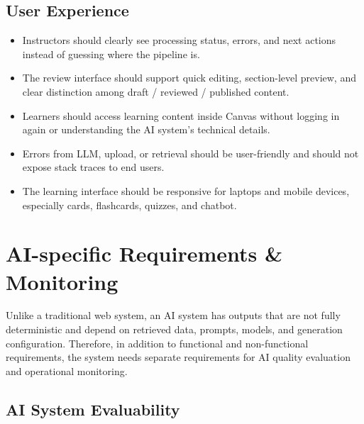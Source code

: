 \subsection{User Experience}
\label{subsec:trai-nghiem-nguoi-dung}

\begin{itemize}
    \item Instructors should clearly see processing status, errors, and next
          actions instead of guessing where the pipeline is.
    \item The review interface should support quick editing, section-level
          preview, and clear distinction among draft / reviewed / published
          content.
    \item Learners should access learning content inside Canvas without
          logging in again or understanding the AI system's technical details.
    \item Errors from LLM, upload, or retrieval should be user-friendly and
          should not expose stack traces to end users.
    \item The learning interface should be responsive for laptops and mobile
          devices, especially cards, flashcards, quizzes, and chatbot.
\end{itemize}

\section{AI-specific Requirements \& Monitoring}
\label{sec:yeu-cau-ai-giam-sat}

Unlike a traditional web system, an AI system has outputs that are not fully
deterministic and depend on retrieved data, prompts, models, and generation
configuration. Therefore, in addition to functional and non-functional
requirements, the system needs separate requirements for AI quality evaluation
and operational monitoring.

\subsection{AI System Evaluability}
\label{subsec:kha-nang-danh-gia-he-thong-ai}

